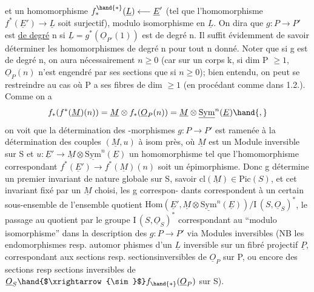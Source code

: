 
et  un homomorphisme  $f^{\hand{*}}_{*}(\underline{L}) \longleftarrow \underline{E}'$  (tel que l'homomorphisme 
$f^{*}(\underline{E}') \to \underline{L}$  soit surjectif), modulo  isomorphisme en $\underline{L}$.  On dira que
$g\colon P \to P'$  est \uline{de degré} n si $\underline{L} = g^{*}(\underline{O}_{P'}(1))$  est de degré n. Il suffit
évidemment de savoir déterminer les homomorphismes de degré n pour tout n
donné.  Noter que si g est de degré n, on aura nécessairement $n \geq 0$
(car  sur un corps k,  si dim P $\geq 1$, $\underline{O}_P(n)$ n'est engendré par ses
sections que si $n \geq 0$); bien entendu, on peut  se restreindre au cas
où P a ses fibres de dim $\geq 1$ (en procédant comme dans 1.2.).  Comme on a
\[ f_{*}(f^{*}(\underline{M})(n)) = \underline{M} \otimes f_{*}(\underline{O}_P(n)) = \underline{M} \otimes \underline{\mathrm{Sym}}^{n}(\underline{E}) \hand{,} \]
on voit que la détermination des -morphismes  $g\colon P \to P'$  est ramenée
à la détermination des couples $(\underline{M},u)$ à isom près, où $\underline{M}$  est un Module
inversible sur S et  $u\colon \underline{E}' \to \underline{M}\otimes\underline{\mathrm{Sym}}^{n}(\underline{E})$  un homomorphisme  tel que
l'homomorphisme correspondant  $f^{*}(\underline{E}') \to f^{*}(\underline{M})(n)$  soit un épimorphisme.
Donc  g détermine un premier invariant de nature globale sur S, savoir
$\mathrm{cl}(\underline{M}) \in \mathrm{Pic}(S)$, et cet invariant fixé par un $\underline{M}$ choisi,  les g correspon-%
dants correspondent à un certain sous-ensemble de l'ensemble quotient
$\mathrm{Hom}(\underline{E}',\underline{M}\otimes\underline{\mathrm{Sym}}^{n}(\underline{E}))/\mathrm{I}\,(S,\underline{O}_S)^{*}$,  le passage au quotient par le groupe
$\mathrm{I}\,(S,\underline{O}_S)^{*}$ correspondant  au  ``modulo isomorphisme'' dans la description
des $g\colon P \to P'$ via Modules inversibles  (NB  les endomorphismes resp. automor
phismes d'un $\underline{L}$ inversible sur un fibré projectif $\underline{P}$, correspondant aux
sections resp. sections\hand{$|$}inversibles de $\underline{O}_P$ sur P,  ou encore des sections
resp sections inversibles de $\underline{O}_S \hand{$\xrightarrow{\sim}$} f_{\hand{*}}(\underline{O}_P)$ sur S).

